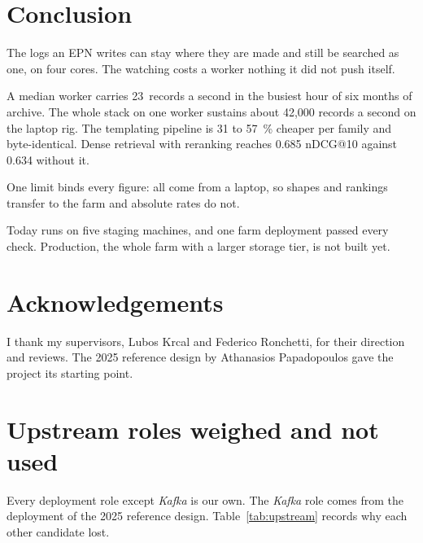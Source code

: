\section{Conclusion}\label{sec:conclusion}

The logs an EPN writes can stay where they are made and still be searched as one, on four cores. The watching costs a worker nothing it did not push itself.

A median worker carries 23~records a second in the busiest hour of six months of archive. The whole stack on one worker sustains about 42,000 records a second on the laptop rig. The templating pipeline is 31 to 57~\% cheaper per family and byte-identical. Dense retrieval with reranking reaches 0.685 nDCG@10 against 0.634 without it.

One limit binds every figure: all come from a laptop, so shapes and rankings transfer to the farm and absolute rates do not.

Today \loggy{} runs on five staging machines, and one farm deployment passed every check. Production, the whole farm with a larger storage tier, is not built yet.

\section*{Acknowledgements}

I thank my supervisors, Lubos Krcal and Federico Ronchetti, for their direction and reviews. The 2025 reference design by Athanasios Papadopoulos \cite{ref:papadopoulos2025} gave the project its starting point.

\appendix

\section{Upstream roles weighed and not used}\label{app:upstream}

Every deployment role except \textit{Kafka} is our own. The \textit{Kafka} role comes from the deployment of the 2025 reference design. Table~\ref{tab:upstream} records why each other candidate lost.

